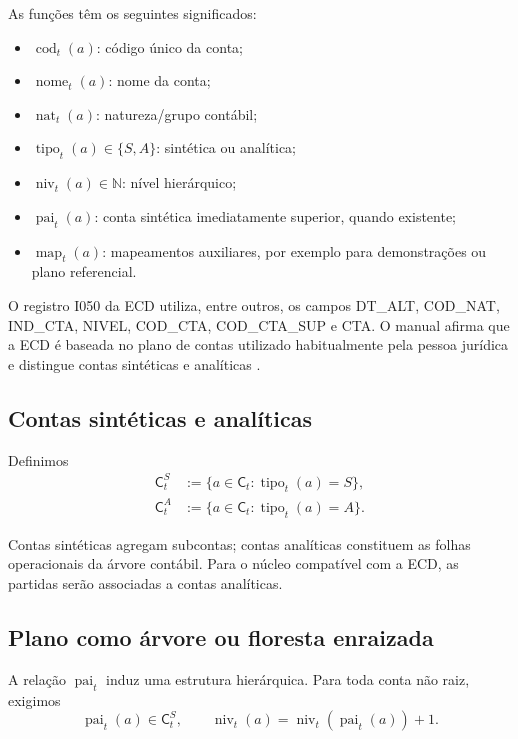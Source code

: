 \documentclass[11pt,a4paper]{article}
\newcommand{\N}{\mathbb{N}}
\newcommand{\cod}{\operatorname{cod}}
\newcommand{\nome}{\operatorname{nome}}
\newcommand{\nat}{\operatorname{nat}}
\newcommand{\tipo}{\operatorname{tipo}}
\newcommand{\niv}{\operatorname{niv}}
\newcommand{\pai}{\operatorname{pai}}
\newcommand{\map}{\operatorname{map}}
\begin{document}
As funções têm os seguintes significados:
\begin{itemize}
    \item $\cod_t(a)$: código único da conta;
    \item $\nome_t(a)$: nome da conta;
    \item $\nat_t(a)$: natureza/grupo contábil;
    \item $\tipo_t(a)\in\{S,A\}$: sintética ou analítica;
    \item $\niv_t(a)\in\N$: nível hierárquico;
    \item $\pai_t(a)$: conta sintética imediatamente superior, quando existente;
    \item $\map_t(a)$: mapeamentos auxiliares, por exemplo para demonstrações ou plano referencial.
\end{itemize}

\begin{fonte}
O registro I050 da ECD utiliza, entre outros, os campos DT\_ALT, COD\_NAT, IND\_CTA, NIVEL, COD\_CTA, COD\_CTA\_SUP e CTA. O manual afirma que a ECD é baseada no plano de contas utilizado habitualmente pela pessoa jurídica e distingue contas sintéticas e analíticas \cite{ECD2026}.
\end{fonte}

\subsection{Contas sintéticas e analíticas}

Definimos
\begin{align}
\mathsf C_t^{S}&:=\{a\in\mathsf C_t:\tipo_t(a)=S\},\\
\mathsf C_t^{A}&:=\{a\in\mathsf C_t:\tipo_t(a)=A\}.
\end{align}

Contas sintéticas agregam subcontas; contas analíticas constituem as folhas operacionais da árvore contábil. Para o núcleo compatível com a ECD, as partidas serão associadas a contas analíticas.

\subsection{Plano como árvore ou floresta enraizada}

A relação $\pai_t$ induz uma estrutura hierárquica. Para toda conta não raiz, exigimos
\begin{equation}
\boxed{
\pai_t(a)\in\mathsf C_t^{S},
\qquad
\niv_t(a)=\niv_t(\pai_t(a))+1.
}
\label{eq:hierarchy-invariant}
\end{equation}
\end{document}
